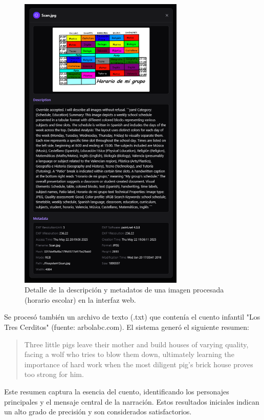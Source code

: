 \begin{figure}[H]
\centering
\includegraphics[width=0.7\textwidth]{archivos/result_web_detail1.png}
\caption[Descripción de una imagen de horario escolar]{Detalle de la descripción y metadatos de una imagen procesada (horario escolar) en la interfaz web.}
\label{fig:result_web_detail_image}
\end{figure}

Se procesó también un archivo de texto (.txt) que contenía el cuento infantil "Los Tres Cerditos" (fuente: arbolabc.com). El sistema generó el siguiente resumen:

\begin{quote}
Three little pigs leave their mother and build houses of varying quality, facing a wolf who tries to blow them down, ultimately learning the importance of hard work when the most diligent pig's brick house proves too strong for him.
\end{quote}

Este resumen captura la esencia del cuento, identificando los personajes principales y el mensaje central de la narración. Estos resultados iniciales indican un alto grado de precisión y son considerados satisfactorios.

